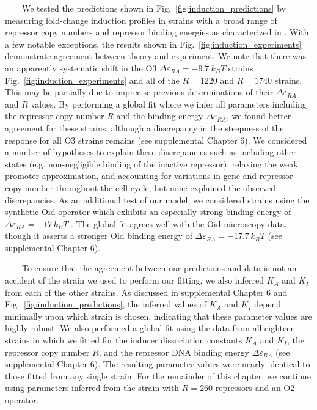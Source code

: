\documentclass[12pt]{caltech_thesis}
\begin{document}
~~~~We tested the predictions shown in
Fig.~\ref{fig:induction_predictions} by measuring fold-change induction
profiles in strains with a broad range of repressor copy numbers and
repressor binding energies as characterized in \textcite{garcia2011}.
With a few notable exceptions, the results shown in
Fig.~\ref{fig:induction_experiments} demonstrate agreement between
theory and experiment. We note that there was an apparently systematic
shift in the O3 \(\Delta\varepsilon_{RA} = -9.7\ k_BT\) strains
Fig.~\ref{fig:induction_experiments} and all of the \(R=1220\) and
\(R =1740\) strains. This may be partially due to imprecise previous
determinations of their \(\Delta\varepsilon_{RA}\) and \(R\) values. By
performing a global fit where we infer all parameters including the
repressor copy number \(R\) and the binding energy
\(\Delta\varepsilon_{RA}\), we found better agreement for these strains,
although a discrepancy in the steepness of the response for all O3
strains remains (see supplemental Chapter 6). We considered a number of
hypotheses to explain these discrepancies such as including other states
(e.g. non-negligible binding of the inactive repressor), relaxing the
weak promoter approximation, and accounting for variations in gene and
repressor copy number throughout the cell cycle, but none explained the
observed discrepancies. As an additional test of our model, we
considered strains using the synthetic Oid operator which exhibits an
especially strong binding energy of
\(\Delta\varepsilon_{RA}=-17\,k_B T\) \autocite{garcia2011}. The global
fit agrees well with the Oid microscopy data, though it asserts a
stronger Oid binding energy of \(\Delta\varepsilon_{RA}=-17.7\,k_B T\)
(see supplemental Chapter 6).

~~~~To ensure that the agreement between our predictions and data is not
an accident of the strain we used to perform our fitting, we also
inferred \(K_A\) and \(K_I\) from each of the other strains. As
discussed in supplemental Chapter 6 and
Fig.~\ref{fig:induction_predictions}, the inferred values of \(K_A\) and
\(K_I\) depend minimally upon which strain is chosen, indicating that
these parameter values are highly robust. We also performed a global fit
using the data from all eighteen strains in which we fitted for the
inducer dissociation constants \(K_A\) and \(K_I\), the repressor copy
number \(R\), and the repressor DNA binding energy
\(\Delta\varepsilon_{RA}\) (see supplemental Chapter 6). The resulting
parameter values were nearly identical to those fitted from any single
strain. For the remainder of this chapter, we continue using parameters
inferred from the strain with \(R=260\) repressors and an O2 operator.
\end{document}
